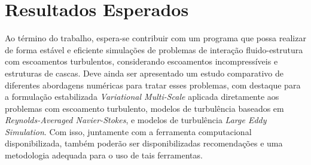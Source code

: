 \chapter{Resultados Esperados} \label{ResultadosEsperados}

Ao término do trabalho, espera-se contribuir com um programa que possa realizar de forma estável e eficiente simulações de problemas de interação fluido-estrutura com escoamentos turbulentos, considerando escoamentos incompressíveis e estruturas de cascas. Deve ainda ser apresentado um estudo comparativo de diferentes abordagens numéricas para tratar esses problemas, com destaque para a formulação estabilizada \textit{Variational Multi-Scale} aplicada diretamente aos problemas com escoamento turbulento, modelos de turbulência baseados em \textit{Reynolds-Averaged Navier-Stokes}, e modelos de turbulência \textit{Large Eddy Simulation}. Com isso, juntamente com a ferramenta computacional disponibilizada, também poderão ser disponibilizadas recomendações e uma metodologia adequada para o uso de tais ferramentas.
